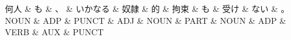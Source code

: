 \documentclass[tikz,border=5pt]{standalone}
\begin{document}
\normalsize
\begin{dependency}[edge unit distance=12.0pt]
    \begin{deptext}[column sep=1em]
        何人 \& も \& 、 \& いかなる \& 奴隷 \& 的 \& 拘束 \& も \& 受け \& ない \& 。\\
        NOUN \& ADP \& PUNCT \& ADJ \& NOUN \& PART \& NOUN \& ADP \& VERB \& AUX \& PUNCT\\
    \end{deptext}
\end{dependency}
\end{document}
